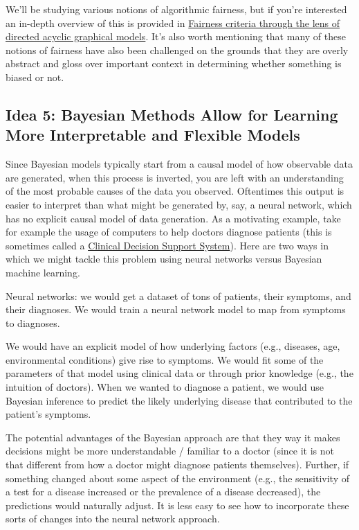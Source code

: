 \documentclass[assignment01_Solutions]{subfiles}
\begin{document}
We'll be studying various notions of algorithmic fairness, but if you're interested an in-depth overview of this is provided in \href{https://arxiv.org/pdf/1906.11333.pdf}{Fairness criteria through the lens of directed acyclic graphical models}.  It's also worth mentioning that many of these notions of fairness have also been challenged on the grounds that they are overly abstract and gloss over important context in determining whether something is biased or not.


\subsection*{Idea 5: Bayesian Methods Allow for Learning More Interpretable and Flexible Models}

Since Bayesian models typically start from a causal model of how observable data are generated, when this process is inverted, you are left with an understanding of the most probable causes of the data you observed.  Oftentimes this output is easier to interpret than what might be generated by, say, a neural network, which has no explicit causal model of data generation.  As a motivating example, take for example the usage of computers to help doctors diagnose patients (this is sometimes called a \href{https://en.wikipedia.org/wiki/Clinical_decision_support_system}{Clinical Decision Support System}).  Here are two ways in which we might tackle this problem using neural networks versus Bayesian machine learning.

\bi
\item Neural networks: we would get a dataset of tons of patients, their symptoms, and their diagnoses.  We would train a neural network model to map from symptoms to diagnoses.
\item We would have an explicit model of how underlying factors (e.g., diseases, age, environmental conditions) give rise to symptoms.  We would fit some of the parameters of that model using clinical data or through prior knowledge (e.g., the intuition of doctors).  When we wanted to diagnose a patient, we would use Bayesian inference to predict the likely underlying disease that contributed to the patient's symptoms.
\ei
 
 The potential advantages of the Bayesian approach are that they way it makes decisions might be more understandable / familiar to a doctor (since it is not that different from how a doctor might diagnose patients themselves).  Further, if something changed about some aspect of the environment (e.g., the sensitivity of a test for a disease increased or the prevalence of a disease decreased), the predictions would naturally adjust.  It is less easy to see how to incorporate these sorts of changes into the neural network approach.
 
\end{document}
